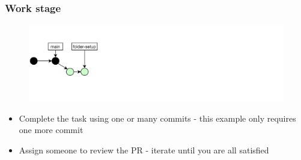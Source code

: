 \documentclass[aspectratio=169]{beamer} %
\begin{document}
\begin{frame}
	\frametitle{Work stage}

	\vspace{-.5cm}
	\begin{minipage}[t][5cm][t]{\textwidth}
		\begin{figure}
			\centering
			\includegraphics[width=\textwidth]{./img/dime-gitflow-network-1-2.png}
		\end{figure}
	\end{minipage}

	\vspace{-.5cm}
	\begin{minipage}[t][5cm][t]{\textwidth}
		\begin{itemize}
			\setlength\itemsep{.5em}
			\item Complete the task using one or many commits - this example only requires one more commit
			\item Assign someone to review the PR - iterate until you are all satisfied
		\end{itemize}
	\end{minipage}

\end{frame}
\end{document}
